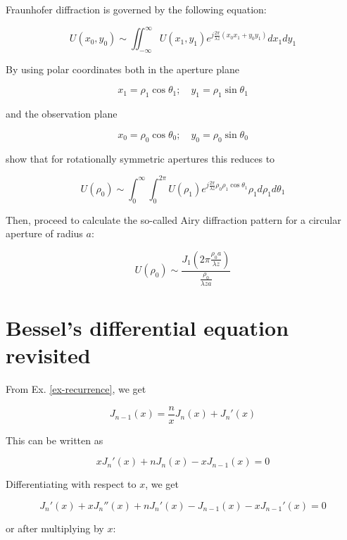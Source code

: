 \begin{sidebar}
\begin{ex}
Fraunhofer diffraction is governed by the following equation:

$$U(x_0, y_0) \sim \iint_{-\infty}^{\infty} U(x_1, y_1) e ^{j \frac{2\pi}{\lambda z} (x_0 x_1 + y_0 y_1)} dx_1 dy_1  $$

By using polar coordinates both in the aperture plane

$$x_1 = \rho_1 \cos \theta_1; \quad y_1 = \rho_1 \sin \theta_1$$

and the observation plane

$$x_0 = \rho_0 \cos \theta_0; \quad y_0 = \rho_0 \sin \theta_0$$

show that for rotationally symmetric apertures this reduces to

$$U(\rho_0) \sim  \int_0^{\infty} \int_0^{2 \pi} U(\rho_1)  e ^{j \frac{2\pi}{\lambda z} \rho_0 \rho_1 \cos \theta_1} \rho_1 d\rho_1 d\theta_1  $$

Then, proceed to calculate the so-called Airy diffraction pattern for a circular aperture of radius $a$:

$$U(\rho_0) \sim \frac {J_1\left( 2 \pi \frac {\rho_0 a}{\lambda z} \right)}{\frac{\rho_0}{\lambda z a}}$$

\end{ex}
\end{sidebar}

\section{Bessel's differential equation revisited}

From Ex. \ref{ex-recurrence}, we get

\begin{equation}
J_{n-1}(x) = \frac{n}{x}J_n(x) + J_n'(x)
\end{equation}

This can be written as

\begin{equation}
x J_n'(x) + n J_n(x) - x J_{n-1}(x) = 0 \label{eq-bessel-dif-rec}
\end{equation} 

Differentiating with respect to $x$, we get

\begin{equation}
J_n'(x) + x J_n''(x) + n J_n'(x) - J_{n-1}(x) - x J_{n-1}'(x)= 0
\end{equation} 

or after multiplying by $x$:

